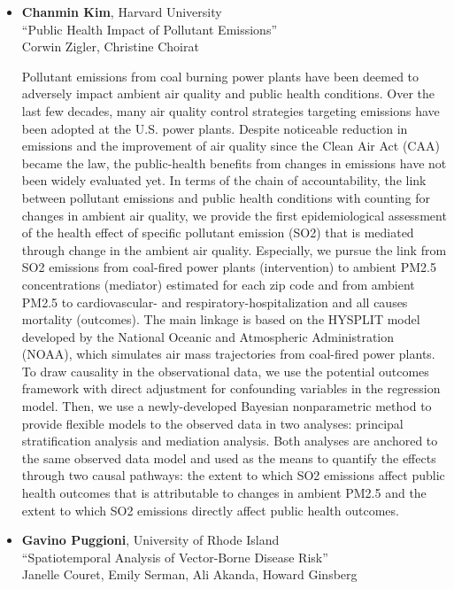 \begin{itemize}
\item \textbf{Chanmin Kim}, Harvard University \\
``Public Health Impact of Pollutant Emissions'' \\
Corwin Zigler, Christine Choirat


Pollutant emissions from coal burning power plants have been deemed to adversely impact ambient air quality and public health conditions. Over the last few decades, many air quality control strategies targeting emissions have been adopted at the U.S. power plants. Despite noticeable reduction in emissions and the improvement of air quality since the Clean Air Act (CAA) became the law, the public-health benefits from changes in emissions have not been widely evaluated yet. In terms of the chain of accountability, the link between pollutant emissions and public health conditions with counting for changes in ambient air quality, we provide the first epidemiological assessment of the health effect of specific pollutant emission (SO2) that is mediated through change in the ambient air quality. Especially, we pursue the link from SO2 emissions from coal-fired power plants (intervention) to ambient PM2.5 concentrations (mediator) estimated for each zip code and from ambient PM2.5 to cardiovascular- and respiratory-hospitalization and all causes mortality (outcomes). The main linkage is based on the HYSPLIT model developed by the National Oceanic and Atmospheric Administration (NOAA), which simulates air mass trajectories from coal-fired power plants. To draw causality in the observational data, we use the potential outcomes framework with direct adjustment for confounding variables in the regression model. Then, we use a newly-developed Bayesian nonparametric method to provide flexible models to the observed data in two analyses: principal stratification analysis and mediation analysis. Both analyses are anchored to the same observed data model and used as the means to quantify the effects through two causal pathways: the extent to which SO2 emissions affect public health outcomes that is attributable to changes in ambient PM2.5 and the extent to which SO2 emissions directly affect public health outcomes.

\item \textbf{Gavino Puggioni}, University of Rhode Island \\
``Spatiotemporal Analysis of Vector-Borne Disease Risk'' \\
Janelle Couret, Emily Serman, Ali Akanda, Howard Ginsberg



\end{itemize}

